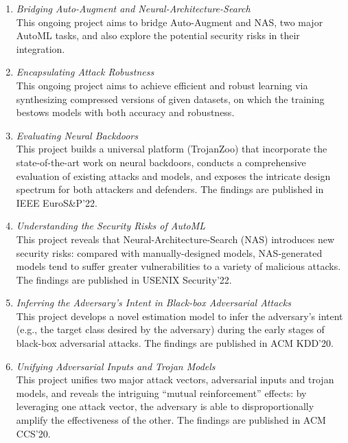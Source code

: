 \documentclass{resume}
\begin{document}
\begin{resume}
\begin{enumerate}[labelsep=18pt, parsep=8pt]

\item {\em Bridging Auto-Augment and Neural-Architecture-Search}\\
This ongoing project aims to bridge Auto-Augment and NAS, two major AutoML tasks, and also explore the potential security risks in their integration.

\item {\em Encapsulating Attack Robustness}\\
This ongoing project aims to achieve efficient and robust learning via synthesizing compressed versions of given datasets, on which the training bestows models with both accuracy and robustness.  

\item {\em  Evaluating Neural Backdoors}\\
This project builds a universal platform (TrojanZoo) that incorporate the state-of-the-art work on neural backdoors, conducts a comprehensive evaluation of existing attacks and models, and exposes the intricate design spectrum for both attackers and defenders. The findings are published in IEEE EuroS\&P'22.

\item {\em Understanding the Security Risks of AutoML}\\
This project reveals that Neural-Architecture-Search (NAS) introduces new security risks: compared with manually-designed models, NAS-generated models tend to suffer greater vulnerabilities to a variety of malicious attacks. The findings are published in USENIX Security'22. 

\item {\em Inferring the Adversary's Intent in Black-box Adversarial Attacks}\\
This project develops a novel estimation model to infer the adversary's intent (e.g., the target class desired by the adversary) during the early stages of black-box adversarial attacks. The findings are published in ACM KDD'20. 

\item {\em Unifying Adversarial Inputs and Trojan Models}\\
This project unifies two major attack vectors, adversarial inputs and trojan models, and reveals the intriguing ``mutual reinforcement'' effects: by leveraging one attack vector, the adversary is able to disproportionally amplify the effectiveness of the other. The findings are published in ACM CCS'20. 


\end{enumerate}
\end{resume}
\end{document}

